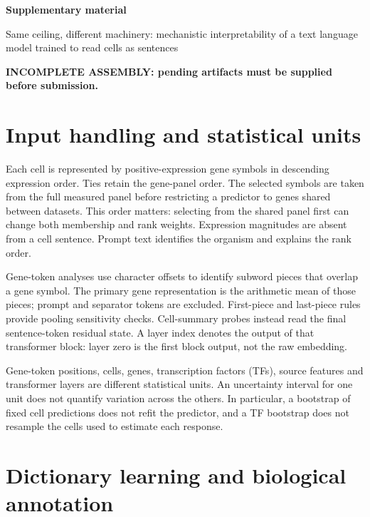 \documentclass[11pt]{article}
\newif\ifSupplementComplete
\begin{document}
\RaggedRight
\setlength{\emergencystretch}{3em}
\begin{center}
{\Large\bfseries Supplementary material}\par\medskip
Same ceiling, different machinery: mechanistic interpretability of a text language model trained to read cells as sentences
\end{center}
\ifSupplementComplete\else
\begin{center}\color{red}\bfseries INCOMPLETE ASSEMBLY: pending artifacts must be supplied before submission.\end{center}
\fi

\section{Input handling and statistical units}

Each cell is represented by positive-expression gene symbols in descending expression order.
Ties retain the gene-panel order. The selected symbols are taken from the full measured panel
before restricting a predictor to genes shared between datasets. This order matters: selecting
from the shared panel first can change both membership and rank weights. Expression magnitudes
are absent from a cell sentence. Prompt text identifies the organism and explains the rank order.

Gene-token analyses use character offsets to identify subword pieces that overlap a gene symbol.
The primary gene representation is the arithmetic mean of those pieces; prompt and separator
tokens are excluded. First-piece and last-piece rules provide pooling sensitivity checks.
Cell-summary probes instead read the final sentence-token residual state. A layer index denotes
the output of that transformer block: layer zero is the first block output, not the raw embedding.



Gene-token positions, cells, genes, transcription factors (TFs), source features and transformer
layers are different statistical units. An uncertainty interval for one unit does not quantify
variation across the others. In particular, a bootstrap of fixed cell predictions does not refit
the predictor, and a TF bootstrap does not resample the cells used to estimate each response.

\section{Dictionary learning and biological annotation}
\end{document}
